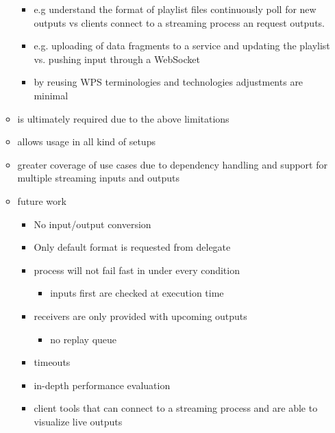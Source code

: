 \begin{itemize}
\begin{itemize}
\begin{itemize}
        \item e.g understand the format of playlist files continuously poll for new outputs vs clients connect to a streaming process an request outputs.
        \item e.g. uploading of data fragments to a service and updating the playlist vs. pushing input through a WebSocket
        \item by reusing WPS terminologies and technologies adjustments are minimal
      \end{itemize}
      \item is ultimately required due to the above limitations
      \item allows usage in all kind of setups
      \item greater coverage of use cases due to dependency handling and support for multiple streaming inputs and outputs
      \item future work
      \begin{itemize}
        \item No input/output conversion
        \item Only default format is requested from delegate
        \item process will not fail fast in under every condition
        \begin{itemize}
          \item inputs first are checked at execution time
        \end{itemize}
        \item receivers are only provided with upcoming outputs
        \begin{itemize}
          \item no replay queue
        \end{itemize}
        \item timeouts
        \item in-depth performance evaluation
        \item client tools that can connect to a streaming process and are able to visualize live outputs
      \end{itemize}
    \end{itemize}
  \end{itemize}
